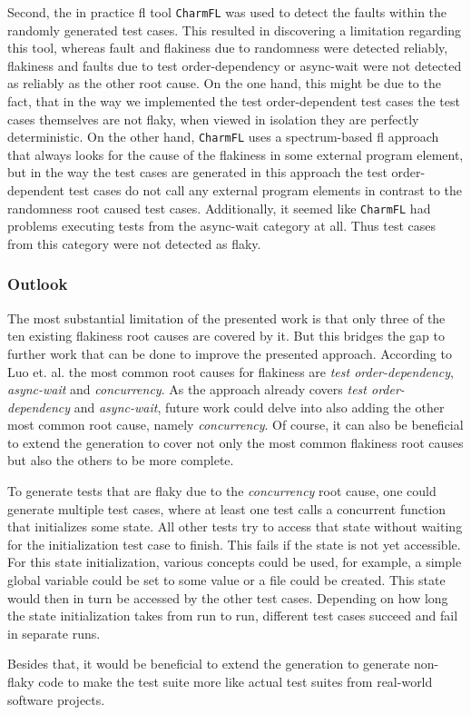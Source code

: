 \documentclass[
fancyheadings, %
%
%
]{stsreprt}
\begin{document}
Second, the in practice \acrshort{fl} tool \texttt{CharmFL} was used to detect the faults within the randomly generated test cases. 
This resulted in discovering a limitation regarding this tool, whereas fault and flakiness due to randomness were detected reliably, flakiness and faults due to test order-dependency or async-wait were not detected as reliably as the other root cause. On the one hand, this might be due to the fact, that in the way we implemented the test order-dependent test cases the test cases themselves are not flaky, when viewed in isolation they are perfectly deterministic. On the other hand, \texttt{CharmFL} uses a spectrum-based \acrshort{fl} approach that always looks for the cause of the flakiness in some external program element, but in the way the test cases are generated in this approach the test order-dependent test cases do not call any external program elements in contrast to the randomness root caused test cases. Additionally, it seemed like \texttt{CharmFL} had problems executing tests from the async-wait category at all. Thus test cases from this category were not detected as flaky. 

\subsubsection{Outlook}
The most substantial limitation of the presented work is that only three of the ten existing flakiness root causes are covered by it. 
But this bridges the gap to further work that can be done to improve the presented approach. 
According to Luo et. al. \cite{luo:2014} the most common root causes for flakiness are \textit{test order-dependency}, \textit{async-wait} and \textit{concurrency}. 
As the approach already covers \textit{test order-dependency} and \textit{async-wait}, future work could delve into also adding the other most common root cause, namely \textit{concurrency}. 
Of course, it can also be beneficial to extend the generation to cover not only the most common flakiness root causes but also the others to be more complete. \par
To generate tests that are flaky due to the \textit{concurrency} root cause, one could generate multiple test cases, where at least one test calls a concurrent function that initializes some state. All other tests try to access that state without waiting for the initialization test case to finish. This fails if the state is not yet accessible. 
For this state initialization, various concepts could be used, for example, a simple global variable could be set to some value or a file could be created. This state would then in turn be accessed by the other test cases. 
Depending on how long the state initialization takes from run to run, different test cases succeed and fail in separate runs. \par
Besides that, it would be beneficial to extend the generation to generate non-flaky code to make the test suite more like actual test suites from real-world software projects.  
\appendix
\end{document}
